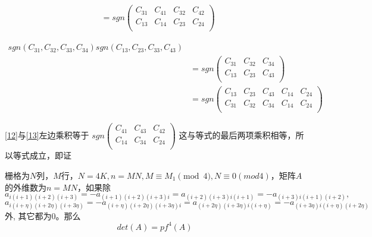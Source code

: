\documentclass{amsc}          %
\numberwithin{equation}{section} %
\begin{document}
\begin{prof}
\begin{equation}\label{12}
\begin{aligned}
&=sgn\left(
\begin{array}{ccccc}
C_{31}&C_{41}&C_{32}&C_{42}\\
C_{13}&C_{14}&C_{23}&C_{24}\\
\end{array}\right)
\end{aligned}
\end{equation}

\begin{equation}\label{13}
\begin{aligned}
sgn(C_{31},C_{32},C_{33},C_{34})sgn(C_{13},C_{23},C_{33},C_{43})\\
&=sgn\left(
\begin{array}{ccccc}
C_{31}&C_{32}&C_{34}\\
C_{13}&C_{23}&C_{43}\\
\end{array}\right)\\
&=sgn\left(
\begin{array}{ccccc}
C_{13}&C_{23}&C_{43}&C_{14}&C_{24}\\
C_{31}&C_{32}&C_{34}&C_{14}&C_{24}\\
\end{array}\right)
\end{aligned}
\end{equation}

\ref{12}与\ref{13}左边乘积等于
$sgn\left(
\begin{array}{ccccc}
C_{41}&C_{43}&C_{42}\\
C_{14}&C_{34}&C_{24}\\
\end{array}\right)$
这与等式的最后两项乘积相等，所以等式成立，即证
\end{prof}

\begin{theorem}
栅格为$N$列，$M$行，$N = 4K,n=MN,M \equiv M_{1} \pmod{4},N \equiv 0 (mod 4)$，矩阵$A$的外维数为$n=MN$，如果除$$a_{i(i+1)(i+2)(i+3)}=-a_{(i+1)(i+2)(i+3)i}=a_{(i+2)(i+3)i(i+1)}=-a_{(i+3)i(i+1)(i+2)},$$$$a_{i(i+\eta)(i+2\eta)(i+3\eta)}=-a_{(i+\eta)(i+2\eta)(i+3\eta)i}=a_{(i+2\eta)(i+3\eta)i(i+\eta)}=-a_{(i+3\eta)i(i+\eta)(i+2\eta)}$$ 外, 其它都为0。那么$$det(A)=pf^{4}(A)$$
\end{theorem}
\end{document}
